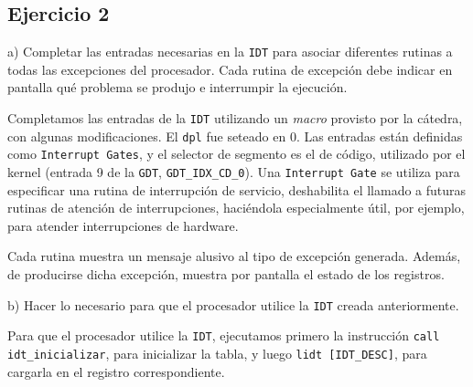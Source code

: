 \vspace*{0.5cm} \noindent



\newpage





\subsection*{Ejercicio 2}
\vspace*{0.5cm}

\noindent
a) Completar las entradas necesarias en la \verb|IDT| para asociar diferentes rutinas a todas las
excepciones del procesador. Cada rutina de excepción debe indicar en pantalla qué problema se produjo
e interrumpir la ejecución.

\vspace*{0.3cm}

Completamos las entradas de la \verb|IDT| utilizando un \textit{macro} provisto por la c\'atedra, con 
algunas modificaciones. El \verb|dpl| fue seteado en 0.
Las entradas est\'an definidas como \verb|Interrupt Gates|, y el selector de segmento es el de 
c\'odigo, utilizado por el kernel (entrada 9 de la \verb|GDT|, \verb|GDT_IDX_CD_0|). Una \verb|Interrupt Gate| se 
utiliza para especificar una rutina de interrupci\'on de servicio, deshabilita el llamado a futuras rutinas de 
atenci\'on de interrupciones, haci\'endola especialmente \'util, por ejemplo, para atender interrupciones de hardware.

Cada rutina muestra un mensaje alusivo al tipo de excepci\'on generada. Adem\'as, de producirse dicha 
excepci\'on, muestra por pantalla el estado de los registros. 

\vspace*{0.5cm} \noindent



\noindent
b) Hacer lo necesario para que el procesador utilice la \verb|IDT| creada anteriormente.

\vspace*{0.3cm}

Para que el procesador utilice la \verb|IDT|, ejecutamos primero la instrucci\'on \verb|call idt_inicializar|, 
para inicializar la tabla, y luego \verb|lidt [IDT_DESC]|, para cargarla en el registro correspondiente.

\vspace*{0.5cm} \noindent



\newpage






